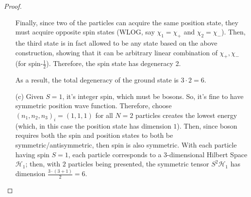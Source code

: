 \documentclass{article}
\begin{document}
\begin{proof}
\begin{itemize}
        Finally, since two of the particles can acquire the same position state, they must acquire opposite spin states (WLOG, say $\chi_1 = \chi_+$ and $\chi_2 = \chi_-$). Then, the third state is in fact allowed to be any state based on the above construction, showing that it can be arbitrary linear combination of $\chi_+,\chi_-$ (for spin-$\frac{1}{2}$). Therefore, the spin state has degeneracy 2.

        As a result, the total degeneracy of the ground state is $3\cdot 2=6$.

        \hfil

        \item[(c)] Given $S=1$, it's integer spin, which must be bosons. So, it's fine to have symmetric position wave function. Therefore, choose $(n_1,n_2,n_3)_i = (1,1,1)$ for all $N=2$ particles creates the lowest energy (which, in this case the position state has dimension $1$). Then, since boson requires both the spin and position states to both be symmetric/antisymmetric, then spin is also symmetric. With each particle having spin $S=1$, each particle corresponds to a $3$-dimensional Hilbert Space $\mathcal{H}_1$; then, with $2$ particles being presented, the symmetric tensor $S^2\mathcal{H}_1$ has dimension $\frac{3\cdot (3+1)}{2} = 6$.
        

\end{itemize}
\end{proof}
\end{document}
